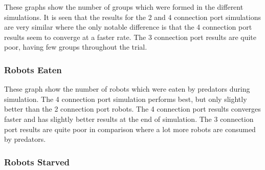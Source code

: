 
These graphs show the number of groups which were formed in the different simulations.
It is seen that the results for the 2 and 4 connection port simulations are very similar where the only notable difference is that the 4 connection port results seem to converge at a faster rate.
The 3 connection port results are quite poor, having few groups throughout the trial.

\vspace*{\fill}
\newpage
\vspace*{\fill}
\begin{center}
	\subsubsection{Robots Eaten}
	\vspace*{-0.6cm}
\end{center}


These graph show the number of robots which were eaten by predators during simulation.
The 4 connection port simulation performs best, but only slightly better than the 2 connection port robots.
The 4 connection port results converges faster and has slightly better results at the end of simulation.
The 3 connection port results are quite poor in comparison where a lot more robots are consumed by predators.

\vspace*{\fill}
\newpage
\vspace*{\fill}
\begin{center}
	\subsubsection{Robots Starved}
	\vspace*{-0.6cm}
\end{center}



